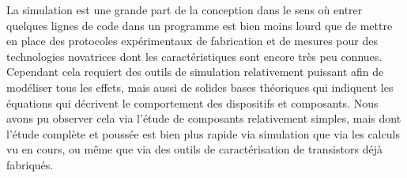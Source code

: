 \documentclass[a4paper,11pt]{report}
\begin{document}
La simulation est une grande part de la conception dans le sens où entrer quelques lignes  de code dans un programme est bien moins lourd que de mettre en place des protocoles expérimentaux de fabrication et de mesures pour des technologies novatrices dont les caractéristiques sont encore très peu connues. Cependant cela requiert des outils de simulation relativement puissant afin de modéliser tous les effets, mais aussi de solides bases théoriques qui indiquent les équations qui décrivent le comportement des dispositifs et composants. Nous avons pu observer cela via l'étude de composants relativement simples, mais dont l'étude complète et poussée est bien plus rapide via simulation que via les calculs vu en cours, ou même que via des outils de caractérisation de transistors déjà fabriqués.
\end{document}

